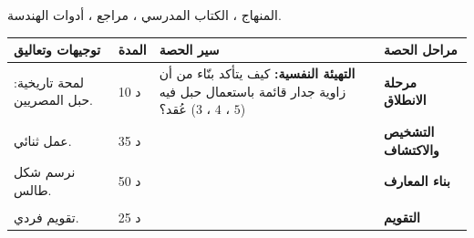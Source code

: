 \documentclass[12pt,a4paper]{article}
\newenvironment{LTR}{\begin{otherlanguage}{english}}{\end{otherlanguage}}
\newcommand{\ar}[1]{\foreignlanguage{arabic}{#1}}
\newcommand{\Phase}[1]{\textbf{#1}}
\newenvironment{Sayr}{%
\begin{LTR}\renewcommand{\arraystretch}{1.25}
\begin{longtable}{|p{0.17\textwidth}|>{\centering\arraybackslash}p{0.06\textwidth}|p{0.53\textwidth}|>{\centering\arraybackslash}p{0.12\textwidth}|}
\hline\rowcolor{cThm!12}\ar{\textbf{توجيهات وتعاليق}} & \ar{\textbf{المدة}} & \ar{\textbf{سير الحصة}} & \ar{\textbf{مراحل الحصة}}\\\hline\endhead
\hline\endfoot}{\end{longtable}\end{LTR}}
\newcommand{\Row}[4]{\ar{\small #4} & \ar{#3} & \ar{#2} & \cellcolor{cThm!8}\ar{\Phase{#1}}\\\hline}
\newcommand{\Lab}[2]{\foreignlanguage{english}{\tcbox[on line,colback=#1,colframe=#1,boxrule=0pt,arc=2pt,boxsep=1pt,left=5pt,right=5pt,top=1pt,bottom=1pt]{\ar{\textcolor{white}{\textbf{#2}}}}}}
\newcommand{\Num}[1]{\foreignlanguage{english}{\tikz[baseline=(c.base)]\node[fill=cDef,text=white,inner sep=2pt,font=\footnotesize\bfseries](c){#1};}}
\newcommand{\ck}{\ensuremath{{\color{cRem}\checkmark}}}
\begin{document}
{المنهاج ، الكتاب المدرسي ، مراجع ، أدوات الهندسة.}
\begin{Sayr}
\Row{مرحلة الانطلاق}{%
\textbf{التهيئة النفسية:} كيف يتأكد بنّاء من أن زاوية جدار قائمة باستعمال حبل فيه عُقد؟ ($3$ ، $4$ ، $5$)}{10 د}{لمحة تاريخية: حبل المصريين.}
\Row{التشخيص والاكتشاف}{%
\Lab{cEx}{مناقشة نشاط 04 صفحتي 209 و 210}\par\ck\ مساحة المربع الكبير بطريقتين تعطي $c^2=a^2+b^2$.\par
\ck\ $ABC$ متقايس الأضلاع ضلعه $6$ cm ، و $D$ منتصف $[BC]$: $AD=\sqrt{36-9}=3\sqrt3$ cm.\par
\ck\ في $ABD$ القائم في $D$: $\cos30^\circ=\dfrac{3\sqrt3}{6}=\dfrac{\sqrt3}2$ ، $\sin30^\circ=\dfrac12$ ، $\tan30^\circ=\dfrac{\sqrt3}3$.\par
}{35 د}{عمل ثنائي.}
\Row{بناء المعارف}{%
\Lab{cThm}{فيثاغورس}\ $ABC$ قائم في $A$ $\iff BC^2=AB^2+AC^2$.\par\Lab{cThm}{طالس}\ إذا كان $M\in(AB)$ ، $N\in(AC)$ و $(MN)\parallel(BC)$ فإن $\dfrac{AM}{AB}=\dfrac{AN}{AC}=\dfrac{MN}{BC}$. \ \textbf{العكس:} إذا كان $\dfrac{AM}{AB}=\dfrac{AN}{AC}$ والنقط بنفس الترتيب فإن $(MN)\parallel(BC)$.\par\smallskip\begin{LTR}\centering\begin{tikzpicture}[scale=0.7,font=\scriptsize]
\coordinate (A) at (0,3); \coordinate (B) at (-1.5,0); \coordinate (C) at (2.5,0);
\coordinate (M) at ($(A)!0.4!(B)$); \coordinate (N) at ($(A)!0.4!(C)$);
\draw[thick] (A)--(B)--(C)--cycle; \draw[cThm,very thick] (M)--(N);
\node[above] at (A){$A$}; \node[below left] at (B){$B$}; \node[below right] at (C){$C$};
\node[left] at (M){$M$}; \node[right] at (N){$N$};
\end{tikzpicture}\end{LTR}\par}{50 د}{نرسم شكل طالس.}
\Row{}{%
\Lab{cThm}{النسب المثلثية}\ في مثلث قائم: $\cos=\dfrac{\text{المجاور}}{\text{الوتر}}$ ، $\sin=\dfrac{\text{المقابل}}{\text{الوتر}}$ ، $\tan=\dfrac{\text{المقابل}}{\text{المجاور}}$.\par\Lab{cThm!80!black}{حذار}\ نطبق فيثاغورس في المثلث القائم فقط ، والوتر هو أطول ضلع.}{}{}
\Row{التقويم}{%
\Lab{cEx}{تطبيق}\par\Num{1} هل المثلث الذي أطواله $5$ ، $12$ ، $13$ قائم؟ \Num{2} $AM=2$ ، $AB=6$ ، $AC=9$ ، $BC=7{,}5$ و $(MN)\parallel(BC)$: احسب $AN$ و $MN$.\par\textbf{الحل:} \Num{1} $25+144=169$: نعم ؛ \Num{2} $AN=3$ و $MN=2{,}5$.\par\textbf{واجب منزلي:} تمارين من الكتاب المدرسي.\par\smallskip\textbf{ملاحظات حول سير الحصة:} \dotfill}{25 د}{تقويم فردي.}
\end{Sayr}
\end{document}
